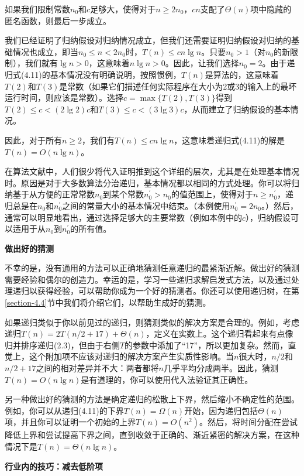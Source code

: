 \documentclass[lang=cn,newtx,10pt,scheme=chinese]{elegantbook}
\begin{document}
如果我们限制常数$n_0$和$c$足够大，使得对于$n \geq 2 n_0$，$c n$支配了$\Theta(n)$项中隐藏的匿名函数，则最后一步成立。

我们已经证明了归纳假设对归纳情况成立，但我们还需要证明归纳假设对归纳的基础情况也成立，即当$n_0 \leq n<2 n_0$时，$T(n) \leq c n \lg n$。只要$n_0>1$（对$n_0$的新限制），我们就有$\lg n>0$，这意味着$n \lg n>0$。因此，让我们选择$n_0=2$。由于递归式(4.11)的基本情况没有明确说明，按照惯例，$T(n)$是算法的，这意味着$T(2)$和$T(3)$是常数（如果它们描述任何实际程序在大小为2或3的输入上的最坏运行时间，则应该是常数）。选择$c=\max \{T(2), T(3)\}$得到$T(2) \leq c<(2 \lg 2) c$和$T(3) \leq c<(3 \lg 3) c$，从而建立了归纳假设的基本情况。

因此，对于所有$n \geq 2$，我们有$T(n) \leq c n \lg n$，这意味着递归式(4.11)的解是$T(n)=O(n \lg n)$。

在算法文献中，人们很少将代入证明推到这个详细的层次，尤其是在处理基本情况时。原因是对于大多数算法分治递归，基本情况都以相同的方式处理。你可以将归纳基于从方便的正常常数$n_0$到某个常数$n_0^{\prime}>n_0$的值范围上，使得对于$n \geq n_0^{\prime}$，递归总是在$n_0$和$n_0^{\prime}$之间的常量大小的基本情况中结束。（本例使用$n_0^{\prime}=2 n_0$。）然后，通常可以明显地看出，通过选择足够大的主要常数（例如本例中的$c$），归纳假设可以适用于从$n_0$到$n_0^{\prime}$的所有值。

\textbf{做出好的猜测}

不幸的是，没有通用的方法可以正确地猜测任意递归的最紧渐近解。做出好的猜测需要经验和偶尔的创造力。幸运的是，学习一些递归求解启发式方法，以及通过处理递归以获得经验，可以帮助你成为一个好的猜测者。你还可以使用递归树，在第\ref{section-4.4}节中我们将介绍它们，以帮助生成好的猜测。

如果递归类似于你以前见过的递归，则猜测类似的解决方案是合理的。例如，考虑递归$T(n)=2 T(n / 2+17)+\Theta(n)$，定义在实数上。这个递归看起来有点像归并排序递归(2.3)，但由于右侧$T$的参数中添加了“17”，所以更加复杂。然而，直觉上，这个附加项不应该对递归的解决方案产生实质性影响。当$n$很大时，$n / 2$和$n / 2+17$之间的相对差异并不大：两者都将$n$几乎平均分成两半。因此，猜测$T(n)=O(n \lg n)$是有道理的，你可以使用代入法验证其正确性。

另一种做出好的猜测的方法是确定递归的松散上下界，然后缩小不确定性的范围。例如，你可以从递归(4.11)的下界$T(n)=\Omega(n)$开始，因为递归包括$\Theta(n)$项，并且你可以证明一个初始的上界$T(n)=O\left(n^2\right)$。然后，将时间分配在尝试降低上界和尝试提高下界之间，直到收敛于正确的、渐近紧密的解决方案，在这种情况下是$T(n)=\Theta(n \lg n)$。

\textbf{行业内的技巧：减去低阶项}
\end{document}
